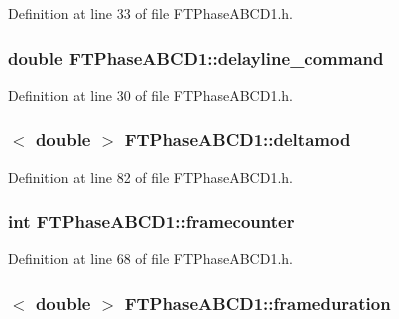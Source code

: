 Definition at line 33 of file FTPhaseABCD1.h.

\hypertarget{classFTPhaseABCD1_a9b071c0d2fa6c2392ad149d09d0e0f40}{
\subsubsection[{delayline\_\-command}]{\setlength{\rightskip}{0pt plus 5cm}double {\bf FTPhaseABCD1::delayline\_\-command}}}
\label{classFTPhaseABCD1_a9b071c0d2fa6c2392ad149d09d0e0f40}


Definition at line 30 of file FTPhaseABCD1.h.

\hypertarget{classFTPhaseABCD1_aeb7776acda071f75923ff5ffe51b8d1e}{
\subsubsection[{deltamod}]{$<$ double $>$ {\bf FTPhaseABCD1::deltamod}}}
\label{classFTPhaseABCD1_aeb7776acda071f75923ff5ffe51b8d1e}


Definition at line 82 of file FTPhaseABCD1.h.

\hypertarget{classFTPhaseABCD1_a2db315608806d1b281341482fd8123e7}{
\subsubsection[{framecounter}]{\setlength{\rightskip}{0pt plus 5cm}int {\bf FTPhaseABCD1::framecounter}}}
\label{classFTPhaseABCD1_a2db315608806d1b281341482fd8123e7}


Definition at line 68 of file FTPhaseABCD1.h.

\hypertarget{classFTPhaseABCD1_a21916a5951e6c54a7aa568642769b614}{
\subsubsection[{frameduration}]{$<$ double $>$ {\bf FTPhaseABCD1::frameduration}}}
\label{classFTPhaseABCD1_a21916a5951e6c54a7aa568642769b614}


